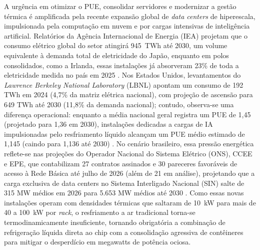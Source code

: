 A urgência em otimizar o PUE, consolidar servidores e modernizar a gestão térmica é amplificada pela recente expansão global de \emph{data centers} de hiperescala, impulsionada pela computação em nuvem e por cargas intensivas de inteligência artificial. Relatórios da Agência Internacional de Energia (IEA) projetam que o consumo elétrico global do setor atingirá 945~TWh até 2030, um volume equivalente à demanda total de eletricidade do Japão, enquanto em polos consolidados, como a Irlanda, essas instalações já absorveram 23\% de toda a eletricidade medida no país em 2025 \cite{iea2025energy, cso2025ireland}. Nos Estados Unidos, levantamentos do \emph{Lawrence Berkeley National Laboratory} (LBNL) apontam um consumo de 192 TWh em 2024 (4,7\% da matriz elétrica nacional), com projeção de ascensão para 649 TWh até 2030 (11,8\% da demanda nacional); contudo, observa-se uma diferença operacional: enquanto a média nacional geral registra um PUE de 1,45 (projetado para 1,36 em 2030), instalações dedicadas a cargas de IA impulsionadas pelo resfriamento líquido alcançam um PUE médio estimado de 1,145 (caindo para 1,136 até 2030) \cite{shehabi2026lbnl}. No cenário brasileiro, essa pressão energética reflete-se nas projeções do Operador Nacional do Sistema Elétrico (ONS), CCEE e EPE, que contabilizam 27 contratos assinados e 30 pareceres favoráveis de acesso à Rede Básica até julho de 2026 (além de 21 em análise), projetando que a carga exclusiva de data centers no Sistema Interligado Nacional (SIN) salte de 315 MW médios em 2026 para 5.653 MW médios até 2030  \cite{ons2026datacenters}. Como essas novas instalações operam com densidades térmicas que saltaram de 10~kW para mais de 40 a 100~kW por \emph{rack}, o resfriamento a ar tradicional torna-se termodinamicamente insuficiente, tornando obrigatória a combinação de refrigeração líquida direta ao chip com a consolidação agressiva de contêineres para mitigar o desperdício em megawatts de potência ociosa.
